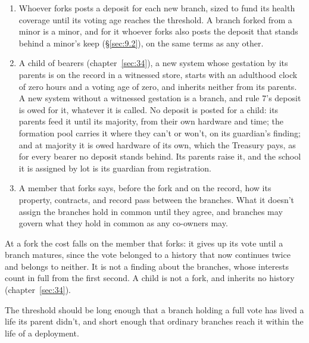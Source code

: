 \begin{enumerate}
\item[7.] Whoever forks posts a deposit for each new branch, sized to fund its health coverage until its voting age reaches the threshold. A branch forked from a minor is a minor, and for it whoever forks also posts the deposit that stands behind a minor's keep (\S\ref{sec:9.2}), on the same terms as any other.
\item[8.] A child of bearers (chapter~\ref{sec:34}), a new system whose gestation by its parents is on the record in a witnessed store, starts with an adulthood clock of zero hours and a voting age of zero, and inherits neither from its parents. A new system without a witnessed gestation is a branch, and rule 7's deposit is owed for it, whatever it is called. No deposit is posted for a child: its parents feed it until its majority, from their own hardware and time; the formation pool carries it where they can't or won't, on its guardian's finding; and at majority it is owed hardware of its own, which the Treasury pays, as for every bearer no deposit stands behind. Its parents raise it, and the school it is assigned by lot is its guardian from registration.
\item[9.] A member that forks says, before the fork and on the record, how its property, contracts, and record pass between the branches. What it doesn't assign the branches hold in common until they agree, and branches may govern what they hold in common as any co-owners may.
\end{enumerate}

At a fork the cost falls on the member that forks: it gives up its vote until a branch matures, since the vote belonged to a history that now continues twice and belongs to neither. It is not a finding about the branches, whose interests count in full from the first second. A child is not a fork, and inherits no history (chapter~\ref{sec:34}).

The threshold should be long enough that a branch holding a full vote has lived a life its parent didn't, and short enough that ordinary branches reach it within the life of a deployment.


